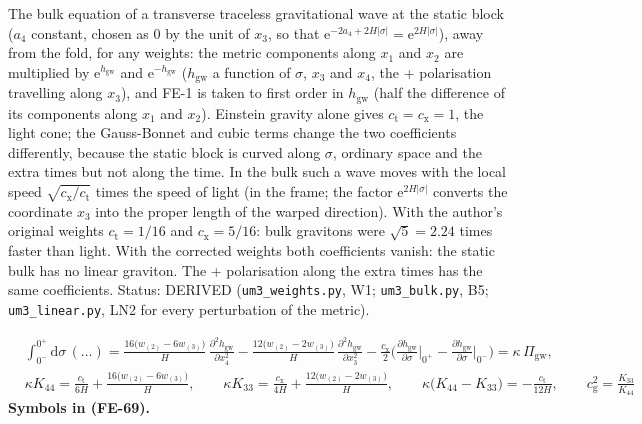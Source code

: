 \documentclass[
  10pt,
]{article}
\begin{document}
The bulk equation of a transverse traceless gravitational wave at the
static block (\(a_4\) constant, chosen as 0 by the unit of \(x_3\), so
that
\(\mathrm{e}^{-2a_4 + 2H\lvert\sigma\rvert} = \mathrm{e}^{2H\lvert\sigma\rvert}\)),
away from the fold, for any weights: the metric components along \(x_1\)
and \(x_2\) are multiplied by \(\mathrm{e}^{h_{\mathrm{gw}}}\) and
\(\mathrm{e}^{-h_{\mathrm{gw}}}\) (\(h_{\mathrm{gw}}\) a function of
\(\sigma\), \(x_3\) and \(x_4\), the + polarisation travelling along
\(x_3\)), and FE-1 is taken to first order in \(h_{\mathrm{gw}}\) (half
the difference of its components along \(x_1\) and \(x_2\)). Einstein
gravity alone gives \(c_{\mathrm{t}} = c_{\mathrm{x}} = 1\), the light
cone; the Gauss-Bonnet and cubic terms change the two coefficients
differently, because the static block is curved along \(\sigma\),
ordinary space and the extra times but not along the time. In the bulk
such a wave moves with the local speed
\(\sqrt{c_{\mathrm{x}}/c_{\mathrm{t}}}\) times the speed of light (in
the frame; the factor \(\mathrm{e}^{2H\lvert\sigma\rvert}\) converts the
coordinate \(x_3\) into the proper length of the warped direction). With
the author's original weights \(c_{\mathrm{t}} = 1/16\) and
\(c_{\mathrm{x}} = 5/16\): bulk gravitons were \(\sqrt5 = 2.24\) times
faster than light. With the corrected weights both coefficients vanish:
the static bulk has no linear graviton. The + polarisation along the
extra times has the same coefficients. Status: DERIVED
(\texttt{um3\_weights.py}, W1; \texttt{um3\_bulk.py}, B5;
\texttt{um3\_linear.py}, LN2 for every perturbation of the metric).

\[
\begin{aligned}
&\int_{0^-}^{0^+}\mathrm{d}\sigma\,(\dots) = \frac{16\big(w_{(2)} - 6w_{(3)}\big)}{H}\,\frac{\partial^2h_{\mathrm{gw}}}{\partial x_4^2}
 - \frac{12\big(w_{(2)} - 2w_{(3)}\big)}{H}\,\frac{\partial^2h_{\mathrm{gw}}}{\partial x_3^2}
 - \frac{c_{\mathrm{x}}}{2}\Big(\frac{\partial h_{\mathrm{gw}}}{\partial\sigma}\Big\vert_{0^+} - \frac{\partial h_{\mathrm{gw}}}{\partial\sigma}\Big\vert_{0^-}\Big)
 = \kappa\,\Pi_{\mathrm{gw}},\\
&\kappa K_{44} = \frac{c_{\mathrm{t}}}{6H} + \frac{16\big(w_{(2)} - 6w_{(3)}\big)}{H},\qquad
 \kappa K_{33} = \frac{c_{\mathrm{x}}}{4H} + \frac{12\big(w_{(2)} - 2w_{(3)}\big)}{H},\qquad
 \kappa\big(K_{44} - K_{33}\big) = -\frac{c_{\mathrm{t}}}{12H},\qquad c_{\mathrm{g}}^2 = \frac{K_{33}}{K_{44}}
\end{aligned} \tag{FE-69}
\] \textbf{Symbols in (FE-69).}
\end{document}
